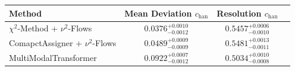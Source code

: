     \begin{tabular}{lccc}
        \toprule
        Method & Mean Deviation $c_{\text{han}}$ & Resolution $c_{\text{han}}$ \\
        \midrule
        $\chi^2$-Method + $\nu^2$-Flows & $0.0376^{+0.0010}_{-0.0012}$ & $0.5457^{+0.0006}_{-0.0010}$ \\
        ComapctAssigner + $\nu^2$-Flows & $0.0489^{+0.0009}_{-0.0009}$ & $0.5481^{+0.0013}_{-0.0011}$ \\
        MultiModalTransformer & $0.0922^{+0.0007}_{-0.0012}$ & $0.5034^{+0.0010}_{-0.0008}$ \\
        \bottomrule
    \end{tabular}
